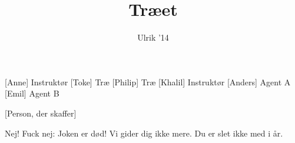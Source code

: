 \documentclass[a4paper,11pt]{article}
\title{Træet}
\author{Ulrik '14}
\begin{document}
\maketitle

\begin{roles}
[Anne] Instruktør
[Toke] Træ
[Philip] Træ
[Khalil] Instruktør
[Anders] Agent A
[Emil] Agent B
\end{roles}

\begin{props}
[Person, der skaffer]
\end{props}

\begin{sketch}




 Nej! Fuck nej: Joken er død! Vi gider dig ikke mere. Du er slet ikke med i år.


\end{sketch}
\end{document}
